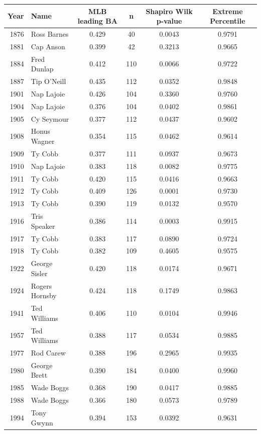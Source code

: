 \documentclass[12pt]{article}
\begin{document}
\begin{table}[H]
\centering
\begin{tabular}{rlcccc}
  \hline
Year & Name & MLB leading BA & n & Shapiro Wilk p-value & Extreme Percentile \\ 
  \hline
1876 & Ross Barnes & 0.429 & 40 & 0.0043 & 0.9791 \\ 
  1881 & Cap Anson & 0.399 & 42 & 0.3213 & 0.9665 \\ 
  1884 & Fred Dunlap & 0.412 & 110 & 0.0066 & 0.9722 \\ 
  1887 & Tip O'Neill & 0.435 & 112 & 0.0352 & 0.9848 \\ 
  1901 & Nap Lajoie & 0.426 & 104 & 0.3360 & 0.9760 \\ 
  1904 & Nap Lajoie & 0.376 & 104 & 0.0402 & 0.9861 \\ 
  1905 & Cy Seymour & 0.377 & 112 & 0.0437 & 0.9602 \\ 
  1908 & Honus Wagner & 0.354 & 115 & 0.0462 & 0.9614 \\ 
  1909 & Ty Cobb & 0.377 & 111 & 0.0937 & 0.9673 \\ 
  1910 & Nap Lajoie & 0.383 & 118 & 0.0082 & 0.9775 \\ 
  1911 & Ty Cobb & 0.420 & 115 & 0.0416 & 0.9663 \\ 
  1912 & Ty Cobb & 0.409 & 126 & 0.0001 & 0.9730 \\ 
  1913 & Ty Cobb & 0.390 & 119 & 0.0132 & 0.9570 \\ 
  1916 & Tris Speaker & 0.386 & 114 & 0.0003 & 0.9915 \\ 
  1917 & Ty Cobb & 0.383 & 117 & 0.0890 & 0.9724 \\ 
  1918 & Ty Cobb & 0.382 & 109 & 0.4605 & 0.9575 \\ 
  1922 & George Sisler & 0.420 & 118 & 0.0174 & 0.9671 \\ 
  1924 & Rogers Hornsby & 0.424 & 118 & 0.1749 & 0.9863 \\ 
  1941 & Ted Williams & 0.406 & 110 & 0.0104 & 0.9946 \\ 
  1957 & Ted Williams & 0.388 & 117 & 0.0534 & 0.9885 \\ 
  1977 & Rod Carew & 0.388 & 196 & 0.2965 & 0.9935 \\ 
  1980 & George Brett & 0.390 & 184 & 0.0400 & 0.9960 \\ 
  1985 & Wade Boggs & 0.368 & 190 & 0.0417 & 0.9885 \\ 
  1988 & Wade Boggs & 0.366 & 180 & 0.0573 & 0.9789 \\ 
  1994 & Tony Gwynn & 0.394 & 153 & 0.0392 & 0.9631 \\ 

\end{tabular}
\end{table}
\end{document}
